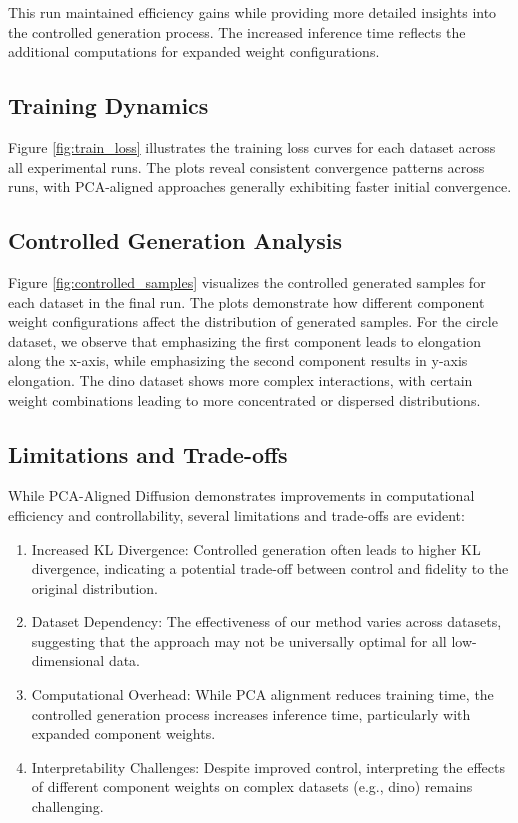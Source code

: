 \documentclass{article} %
\begin{document}
This run maintained efficiency gains while providing more detailed insights into the controlled generation process. The increased inference time reflects the additional computations for expanded weight configurations.

\subsection{Training Dynamics}
Figure \ref{fig:train_loss} illustrates the training loss curves for each dataset across all experimental runs. The plots reveal consistent convergence patterns across runs, with PCA-aligned approaches generally exhibiting faster initial convergence.

\subsection{Controlled Generation Analysis}
Figure \ref{fig:controlled_samples} visualizes the controlled generated samples for each dataset in the final run. The plots demonstrate how different component weight configurations affect the distribution of generated samples. For the circle dataset, we observe that emphasizing the first component leads to elongation along the x-axis, while emphasizing the second component results in y-axis elongation. The dino dataset shows more complex interactions, with certain weight combinations leading to more concentrated or dispersed distributions.

\subsection{Limitations and Trade-offs}
While PCA-Aligned Diffusion demonstrates improvements in computational efficiency and controllability, several limitations and trade-offs are evident:

\begin{enumerate}
    \item Increased KL Divergence: Controlled generation often leads to higher KL divergence, indicating a potential trade-off between control and fidelity to the original distribution.
    \item Dataset Dependency: The effectiveness of our method varies across datasets, suggesting that the approach may not be universally optimal for all low-dimensional data.
    \item Computational Overhead: While PCA alignment reduces training time, the controlled generation process increases inference time, particularly with expanded component weights.
    \item Interpretability Challenges: Despite improved control, interpreting the effects of different component weights on complex datasets (e.g., dino) remains challenging.
\end{enumerate}
\end{document}
